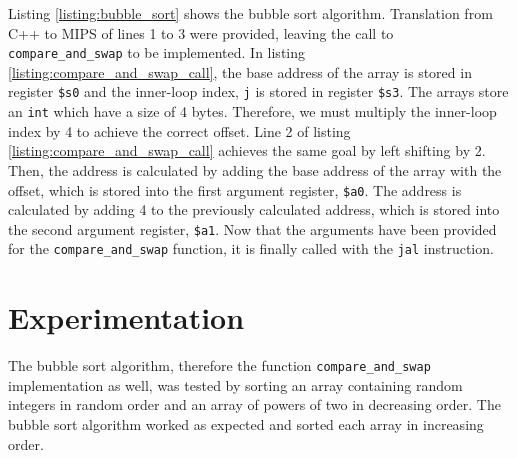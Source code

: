 \documentclass[11pt]{report}
\begin{document}


Listing \ref{listing:bubble_sort} shows the bubble sort algorithm. Translation from C++ to MIPS of
lines 1 to 3 were provided, leaving the call to \verb|compare_and_swap| to be implemented. In
listing \ref{listing:compare_and_swap_call}, the base address of the array is stored in register
\verb|$s0| and the inner-loop index, \verb|j| is stored in register \verb|$s3|. The arrays store an
\verb|int| which have a size of 4 bytes. Therefore, we must multiply the inner-loop index by 4 to
achieve the correct offset. Line 2 of listing \ref{listing:compare_and_swap_call} achieves the same
goal by left shifting by 2. Then, the address  is calculated by adding the base
address of the array with the offset, which is stored into the first argument register, \verb|$a0|.
The address  is calculated by adding 4 to the previously calculated address,
which is stored into the second argument register, \verb|$a1|. Now that the arguments have been
provided for the \verb|compare_and_swap| function, it is finally called with the \verb|jal|
instruction.

\section*{Experimentation}
The bubble sort algorithm, therefore the function \verb|compare_and_swap| implementation as well,
was tested by sorting an array containing random integers in random order and an array of powers of
two in decreasing order. The bubble sort algorithm worked as expected and sorted each array in
increasing order.

\newpage
\end{document}
